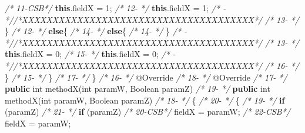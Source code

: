 \documentclass[
]{article}
\newenvironment{Shaded}{\begin{snugshade}}{\end{snugshade}}
\newcommand{\AttributeTok}[1]{\textcolor[rgb]{0.77,0.63,0.00}{#1}}
\newcommand{\BuiltInTok}[1]{#1}
\newcommand{\CommentTok}[1]{\textcolor[rgb]{0.56,0.35,0.01}{\textit{#1}}}
\newcommand{\DataTypeTok}[1]{\textcolor[rgb]{0.13,0.29,0.53}{#1}}
\newcommand{\DecValTok}[1]{\textcolor[rgb]{0.00,0.00,0.81}{#1}}
\newcommand{\FunctionTok}[1]{\textcolor[rgb]{0.00,0.00,0.00}{#1}}
\newcommand{\KeywordTok}[1]{\textcolor[rgb]{0.13,0.29,0.53}{\textbf{#1}}}
\newcommand{\NormalTok}[1]{#1}
\begin{document}
\begin{Shaded}
\begin{Highlighting}[]
\CommentTok{/* 11-CSB*/}            \KeywordTok{this}\NormalTok{.}\FunctionTok{fieldX}\NormalTok{ = }\DecValTok{1}\NormalTok{;                             }\CommentTok{/* 12-   */}            \KeywordTok{this}\NormalTok{.}\FunctionTok{fieldX}\NormalTok{ = }\DecValTok{1}\NormalTok{;                             }
\CommentTok{/*   -   *//*XXXXXXXXXXXXXXXXXXXXXXXXXXXXXXXXXXXXXX*/}               \CommentTok{/* 13-   */}\NormalTok{        \}                                                            }
\CommentTok{/* 12-   */}        \KeywordTok{else}\NormalTok{\{                                            }\CommentTok{/* 14-   */}        \KeywordTok{else}\NormalTok{\{                                            }
\CommentTok{/* 14-   */}\NormalTok{     \}                                                   }\CommentTok{/*   -   *//*XXXXXXXXXXXXXXXXXXXXXXXXXXXXXXXXXXXXXX*/}               
\CommentTok{/* 13-   */}            \KeywordTok{this}\NormalTok{.}\FunctionTok{fieldX}\NormalTok{ = }\DecValTok{0}\NormalTok{;                             }\CommentTok{/* 15-   */}            \KeywordTok{this}\NormalTok{.}\FunctionTok{fieldX}\NormalTok{ = }\DecValTok{0}\NormalTok{;                             }
\CommentTok{/*   -   *//*XXXXXXXXXXXXXXXXXXXXXXXXXXXXXXXXXXXXXX*/}               \CommentTok{/* 16-   */}\NormalTok{        \}                                                }
\CommentTok{/* 15-   */}\NormalTok{    \}                                                    }\CommentTok{/* 17-   */}\NormalTok{    \}                                                    }
\CommentTok{/* 16-   */}    \AttributeTok{@Override}                                            \CommentTok{/* 18-   */}    \AttributeTok{@Override}                                            
\CommentTok{/* 17-   */}    \KeywordTok{public} \DataTypeTok{int} \FunctionTok{methodX}\NormalTok{(}\DataTypeTok{int}\NormalTok{ paramW, }\BuiltInTok{Boolean}\NormalTok{ paramZ)       }\CommentTok{/* 19-   */}    \KeywordTok{public} \DataTypeTok{int} \FunctionTok{methodX}\NormalTok{(}\DataTypeTok{int}\NormalTok{ paramW, }\BuiltInTok{Boolean}\NormalTok{ paramZ)       }
\CommentTok{/* 18-   */}\NormalTok{    \{                                                    }\CommentTok{/* 20-   */}\NormalTok{    \{                                                    }
\CommentTok{/* 19-   */}        \KeywordTok{if}\NormalTok{ (paramZ)                                      }\CommentTok{/* 21-   */}        \KeywordTok{if}\NormalTok{ (paramZ)                                      }
\CommentTok{/* 20-CSB*/}\NormalTok{            fieldX = paramW;                             }\CommentTok{/* 22-CSB*/}\NormalTok{            fieldX = paramW;                             }

\end{Highlighting}
\end{Shaded}
\end{document}
